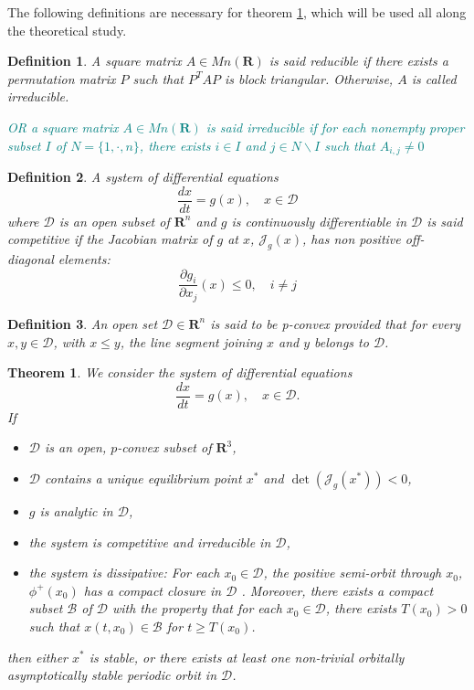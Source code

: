 \documentclass{article}
\newcommand{\marc}[1]{\textcolor{teal}{#1}}
\newtheorem{theorem}{Theorem}
\newtheorem{definition}{Definition}
\begin{document}
The following definitions are necessary for theorem \ref{theorem: periodicASOrbit}, which will be used all along the theoretical study.

\begin{definition}\cite{kaszkurewicz_matrix_2012}
A square matrix $A \in Mn (\mathbf{R})$ is said reducible if there exists a
permutation matrix $P$ such that $P^ T AP$ is block triangular. Otherwise, $A$ is called irreducible.

\marc{OR a square matrix $A \in Mn (\mathbf{R})$ is said irreducible if for each nonempty proper subset $I$ of $N = \{1, \cdot, n\}$, there exists $i \in I$ and $j \in N\backslash I$ such that $A_{i,j} \neq 0$}
\end{definition}

\begin{definition}\cite{smith_monotone_1995}
A system of differential equations
$$ \dfrac{d x}{dt} = g(x), \quad x \in \mathcal{D}$$
where $\mathcal{D}$ is an open subset of $\mathbf{R}^n$ and $g$ is continuously differentiable in $\mathcal{D}$ is said competitive if the Jacobian matrix of $g$ at $x$, $\mathcal{J}_g(x)$, has non positive off-diagonal elements:
$$ \dfrac{\partial g_i}{\partial x_j}(x) \leq 0, \quad i \neq j
$$
\end{definition}

\begin{definition}
An open set $\mathcal{D} \in \mathbf{R}^n$ is said to be p-convex provided that for every $x, y \in \mathcal{D}$, with $x \leq y$, the line segment joining $x$ and $y$ belongs to $\mathcal{D}$.
\end{definition}

\begin{theorem}\cite{zhu_stable_1994}\label{theorem: periodicASOrbit}
We consider the system of differential equations
$$
\dfrac{dx}{dt} = g(x), \quad x \in \mathcal{D}.
$$
If
\begin{itemize}
\item $\mathcal{D}$ is an open, $p$-convex subset of $\mathbf{R}^3$,
\item $\mathcal{D}$ contains a unique equilibrium point $x^*$ and $\det(\mathcal{J}_g(x^*)) < 0$,
\item $g$ is analytic in $\mathcal{D}$,
\item the system is competitive and irreducible in $\mathcal{D}$,
\item the system is dissipative: For each $x_0 \in \mathcal{D}$, the positive semi-orbit through $x_0$, $\phi^+(x_0)$ has a compact closure in $\mathcal{D}$ . Moreover, there exists a compact subset $\mathcal{B}$ of $\mathcal{D}$ with the property that for each $x_0 \in \mathcal{D}$, there exists $T(x_0) > 0$ such that $x(t, x_0) \in \mathcal{B}$ for $t \geq T(x_0)$.
\end{itemize}

then either $x^*$ is stable, or there exists at least one non-trivial orbitally asymptotically stable  periodic orbit in $\mathcal{D}$.
\end{theorem}
\end{document}
